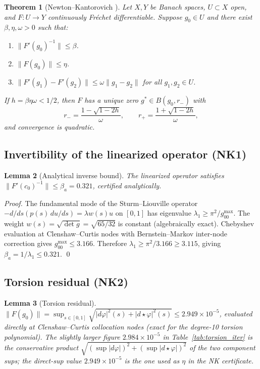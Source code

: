 \documentclass[11pt,a4paper]{article}
\newtheorem{theorem}{Theorem}[section]
\newtheorem{lemma}[theorem]{Lemma}
\theoremstyle{definition}
\theoremstyle{remark}
\begin{document}
\begin{theorem}[Newton--Kantorovich {\cite{Kantorovich1948,OrtegaRheinboldt1970}}]\label{thm:NK}
Let $X, Y$ be Banach spaces, $U \subset X$ open, and $F: U \to Y$ continuously Fr\'echet differentiable. Suppose $g_0 \in U$ and there exist $\beta, \eta, \omega > 0$ such that:
\begin{enumerate}
\item[(NK1)] $\|F'(g_0)^{-1}\| \leq \beta$.
\item[(NK2)] $\|F(g_0)\| \leq \eta$.
\item[(NK3)] $\|F'(g_1) - F'(g_2)\| \leq \omega \|g_1 - g_2\|$ for all $g_1, g_2 \in U$.
\end{enumerate}
If $h = \beta\eta\omega < 1/2$, then $F$ has a unique zero $g^* \in B(g_0, r_-)$ with
\[
r_- = \frac{1 - \sqrt{1 - 2h}}{\omega}, \qquad r_+ = \frac{1 + \sqrt{1 - 2h}}{\omega},
\]
and convergence is quadratic.
\end{theorem}

\subsection{Invertibility of the linearized operator (NK1)}

\begin{lemma}[Analytical inverse bound]\label{lem:beta}
The linearized operator satisfies $\|F'(c_0)^{-1}\| \leq \beta_a = 0.321$, certified analytically.
\end{lemma}

\begin{proof}
The fundamental mode of the Sturm--Liouville operator $-d/ds(p(s)\, du/ds) = \lambda w(s) u$ on $[0,1]$ has eigenvalue $\lambda_1 \geq \pi^2/g_{00}^{\max}$. The weight $w(s) = \sqrt{\det g} = \sqrt{65/32}$ is constant (algebraically exact). Chebyshev evaluation at Clenshaw--Curtis nodes with Bernstein--Markov inter-node correction gives $g_{00}^{\max} \leq 3.166$. Therefore $\lambda_1 \geq \pi^2/3.166 \geq 3.115$, giving $\beta_a = 1/\lambda_1 \leq 0.321$. \qed
\end{proof}

\subsection{Torsion residual (NK2)}

\begin{lemma}[Torsion residual]\label{lem:eta}
$\|F(g_0)\| = \sup_{s \in [0,1]} \sqrt{|d\varphi|^2(s) + |d\star\varphi|^2(s)} \leq 2.949 \times 10^{-5}$, evaluated directly at Clenshaw--Curtis collocation nodes (exact for the degree-10 torsion polynomial). The slightly larger figure $2.984 \times 10^{-5}$ in Table~\ref{tab:torsion_iter} is the conservative product $\sqrt{(\sup |d\varphi|)^2 + (\sup |d\star\varphi|)^2}$ of the two component sups; the direct-sup value $2.949 \times 10^{-5}$ is the one used as $\eta$ in the NK certificate.
\end{lemma}
\end{document}
